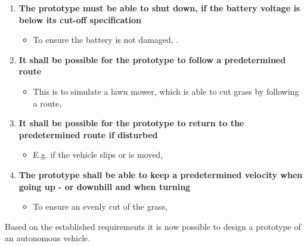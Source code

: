 \begin{enumerate}
\item \textbf{The prototype must be able to shut down, if the battery voltage is below its cut-off specification}
	\begin{itemize}
	\item[] To ensure the battery is not damaged, .
	\end{itemize}
\item \textbf{It shall be possible for the prototype to follow a predetermined route}
	\begin{itemize}
	\item[] This is to simulate a lawn mower, which is able to cut grass by following a route, 
	\end{itemize}
\item \textbf{It shall be possible for the prototype to return to the predetermined route if disturbed}
	\begin{itemize}
	\item[] E.g. if the vehicle slips or is moved, 
	\end{itemize}
\item \textbf{The prototype shall be able to keep a predetermined velocity when going up - or downhill and when turning}
	\begin{itemize}
	\item[] To ensure an evenly cut of the grass, 
	\end{itemize}
\end{enumerate}

Based on the established requirements it is now possible to design a prototype of an autonomous vehicle.